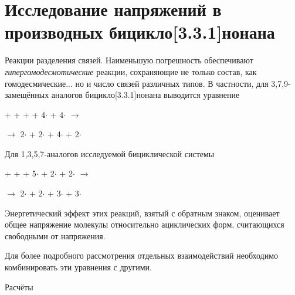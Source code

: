 \chapter{Исследование напряжений в производных бицикло[3.3.1]нонана}

Реакции разделения связей. Наименьшую погрешность обеспечивают \emph{гипергомодесмотические} реакции, сохраняющие не только состав, как гомодесмические... но и число связей различных типов. В частности, для 3,7,9-замещённых аналогов бицикло[3.3.1]нонана выводится уравнение
\begin{center}
  +  +  +  + 4\(\cdot\) 
  + 4\(\cdot\)
  \(\longrightarrow\)
  
  \(\longrightarrow\) 
  2\(\cdot\) + 2\(\cdot\) + 4\(\cdot\) + 
  2\(\cdot\)
\end{center}

Для 1,3,5,7-аналогов исследуемой бициклической системы
\begin{center}
  +  +  + 5\(\cdot\) 
  + 2\(\cdot\)
  + 2\(\cdot\)
  \(\longrightarrow\)
  
  \(\longrightarrow\) 
  2\(\cdot\) + 2\(\cdot\) + 3\(\cdot\) + 3\(\cdot\)
\end{center}

Энергетический эффект этих реакций, взятый с обратным знаком, оценивает общее напряжение молекулы относительно ациклических форм, считающихся свободными от напряжения. 

Для более подробного рассмотрения отдельных взаимодействий необходимо комбинировать эти уравнения с другими.

Расчёты 

